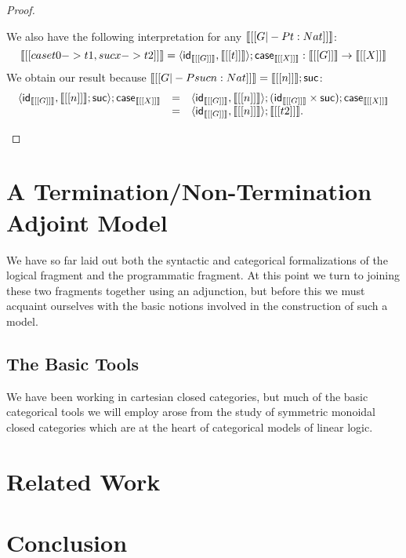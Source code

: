 \begin{proof}
\begin{itemize}
    We also have the following interpretation for any $\llbracket [[G |-P t : Nat]] \rrbracket$:
    \[
    \llbracket [[case t {0 -> t1, suc x -> t2}]] \rrbracket =
    \langle \mathsf{id}_{\llbracket [[G]] \rrbracket}, \llbracket [[t]] \rrbracket \rangle;\mathsf{case}_{\llbracket [[X]] \rrbracket} : \llbracket [[G]] \rrbracket \rightarrow \llbracket [[X]] \rrbracket
    \]
    We obtain our result because $\llbracket [[G |-P suc n : Nat]] \rrbracket = \llbracket [[n]] \rrbracket;\mathsf{suc}$:
    \[
    \begin{array}{lll}
      \langle \mathsf{id}_{\llbracket [[G]] \rrbracket}, \llbracket [[n]] \rrbracket;\mathsf{suc} \rangle;\mathsf{case}_{\llbracket [[X]] \rrbracket}
      &  = & \langle \mathsf{id}_{\llbracket [[G]] \rrbracket}, \llbracket [[n]] \rrbracket \rangle;(\mathsf{id}_{\llbracket [[G]] \rrbracket} \times \mathsf{suc});\mathsf{case}_{\llbracket [[X]] \rrbracket}\\
      &  = & \langle \mathsf{id}_{\llbracket [[G]] \rrbracket}, \llbracket [[n]] \rrbracket \rangle;\llbracket [[t2]] \rrbracket.
    \end{array}
    \]
  \end{itemize}
\end{proof}

\section{A Termination/Non-Termination Adjoint Model}
\label{sec:a_termination/non-termination_adjoint_model}
We have so far laid out both the syntactic and categorical
formalizations of the logical fragment and the programmatic fragment.
At this point we turn to joining these two fragments together using an
adjunction, but before this we must acquaint ourselves with the basic
notions involved in the construction of such a model.

\subsection{The Basic Tools}
\label{subsec:the_basic_tools}
We have been working in cartesian closed categories, but much of the
basic categorical tools we will employ arose from the study of
symmetric monoidal closed categories which are at the heart of
categorical models of linear logic.


\section{Related Work}
\label{sec:related_work}

\section{Conclusion}
\label{sec:conclusion}




\nocite{*}
\appendix

